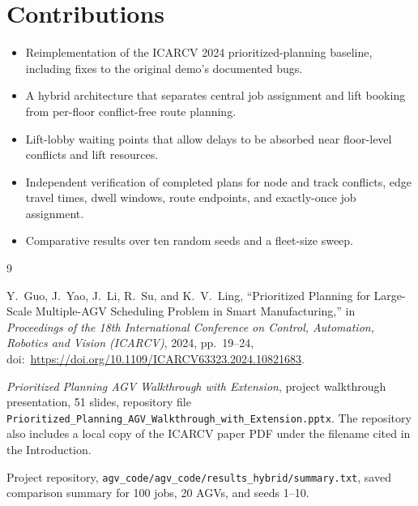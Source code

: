 \documentclass[11pt]{article}
\begin{document}
\section*{Contributions}
\begin{itemize}
  \item Reimplementation of the ICARCV 2024 prioritized-planning baseline,
        including fixes to the original demo's documented bugs.
  \item A hybrid architecture that separates central job assignment and lift
        booking from per-floor conflict-free route planning.
  \item Lift-lobby waiting points that allow delays to be absorbed near
        floor-level conflicts and lift resources.
  \item Independent verification of completed plans for node and track
        conflicts, edge travel times, dwell windows, route endpoints, and
        exactly-once job assignment.
  \item Comparative results over ten random seeds and a fleet-size sweep.
\end{itemize}

\begin{thebibliography}{9}

Y.~Guo, J.~Yao, J.~Li, R.~Su, and K.~V.~Ling,
``Prioritized Planning for Large-Scale Multiple-AGV Scheduling Problem in
Smart Manufacturing,'' in \emph{Proceedings of the 18th International
Conference on Control, Automation, Robotics and Vision (ICARCV)}, 2024,
pp.~19--24, doi:~\url{https://doi.org/10.1109/ICARCV63323.2024.10821683}.

\emph{Prioritized Planning AGV Walkthrough with Extension}, project
walkthrough presentation, 51 slides, repository file
\texttt{Prioritized\_Planning\_AGV\_Walkthrough\_with\_Extension.pptx}.
The repository also includes a local copy of the ICARCV paper PDF under the
filename cited in the Introduction.

Project repository, \texttt{agv\_code/agv\_code/results\_hybrid/summary.txt},
saved comparison summary for 100 jobs, 20 AGVs, and seeds 1--10.

\end{thebibliography}
\end{document}
